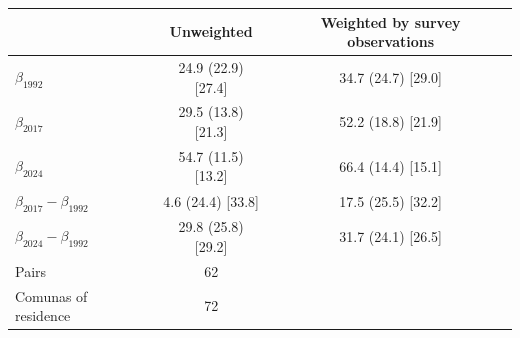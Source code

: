 \begin{tabular}{lcc}
\toprule
 & Unweighted & Weighted by survey observations \\
\midrule
$\beta_{1992}$ & 24.9 (22.9) [27.4] & 34.7 (24.7) [29.0] \\
$\beta_{2017}$ & 29.5 (13.8) [21.3] & 52.2 (18.8) [21.9] \\
$\beta_{2024}$ & 54.7 (11.5) [13.2] & 66.4 (14.4) [15.1] \\
\midrule
$\beta_{2017}-\beta_{1992}$ & 4.6 (24.4) [33.8] & 17.5 (25.5) [32.2] \\
$\beta_{2024}-\beta_{1992}$ & 29.8 (25.8) [29.2] & 31.7 (24.1) [26.5] \\
\midrule
Pairs & 62 & \\
Comunas of residence & 72 & \\
\bottomrule
\end{tabular}
